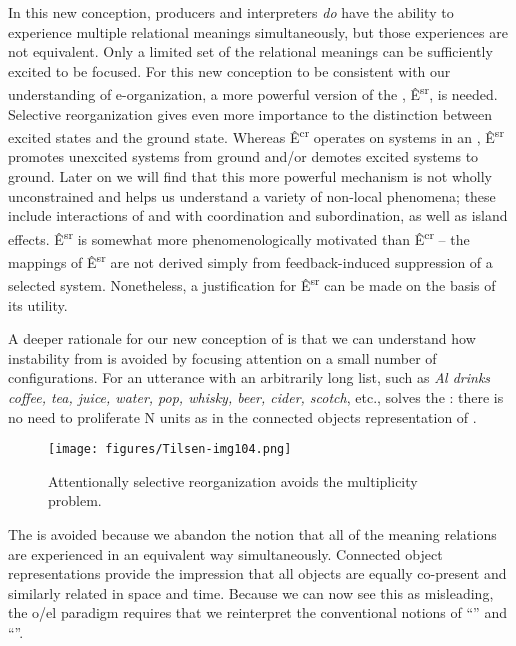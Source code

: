   In this new conception, producers and interpreters \textit{do} have the ability to experience multiple relational meanings simultaneously, but those experiences are not equivalent. Only a limited set of the relational meanings can be sufficiently excited to be  focused. For this new conception to be consistent with our understanding of e-organization, a more powerful version of the , Ê\textsuperscript{sr},  is needed. Selective reorganization gives even more importance to the distinction between excited states and the ground state. Whereas Ê\textsuperscript{cr} operates on systems in an , Ê\textsuperscript{sr} promotes unexcited systems from ground and/or demotes excited systems to ground. Later on we will find that this more powerful mechanism is not wholly unconstrained and helps us understand a variety of non-local phenomena; these include interactions of  and  with coordination and subordination, as well as island effects. Ê\textsuperscript{sr} is somewhat more phenomenologically motivated than Ê\textsuperscript{cr} -- the mappings of Ê\textsuperscript{sr} are not derived simply from feedback-induced suppression of a selected system. Nonetheless, a justification for Ê\textsuperscript{sr} can be made on the basis of its utility.

  A deeper rationale for our new conception of   is that we can understand how instability from  is avoided by focusing attention on a small number of configurations.  For an utterance with an arbitrarily long list, such as \textit{Al drinks coffee, tea, juice, water, pop, whisky, beer, cider, scotch}, etc.,   solves the : there is no need to proliferate N units as in the connected objects representation of {}. 

  
\begin{figure}
\texttt{[image: figures/Tilsen-img104.png]}
\caption{Attentionally selective reorganization avoids the multiplicity problem.}
\label{fig:4:54}
\end{figure}
 

  The  is avoided because we abandon the notion that all of the meaning relations are experienced in an equivalent way simultaneously. Connected object representations provide the impression that all objects are equally co-present and similarly related in space and time. Because we can now see this as misleading, the o/el paradigm requires that we reinterpret the conventional notions of “” and “”.

